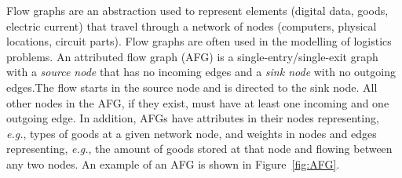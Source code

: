 Flow graphs are an abstraction used to represent elements (\eg digital data, goods, electric current) that travel through a network of nodes (\eg computers, physical locations, circuit parts). Flow graphs are often used in the modelling of logistics problems. An attributed flow graph (AFG) is a single-entry/single-exit graph with a \emph{source node} that has no incoming edges and a \emph{sink node} with no outgoing edges.The flow starts in the source node and is directed to the sink node. All other nodes in the AFG, if they exist, must have at least one incoming and one outgoing edge. In addition, AFGs have attributes in their nodes representing, \emph{e.g.}, types of goods at a given network node, and weights in nodes and edges representing, \emph{e.g.}, the amount of goods stored at that node and flowing between any two nodes. An example of an AFG is shown in Figure~\ref{fig:AFG}.


